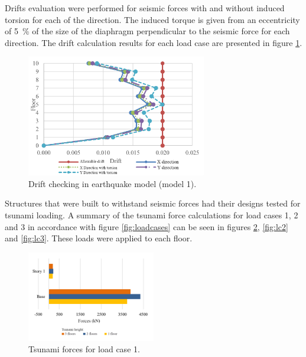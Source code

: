 \documentclass{cup-pan}
\begin{document}
Drifts evaluation were performed for seismic forces with and without induced torsion for each of the direction. The induced torque is given from an eccentricity of \SI{5}{\percent} of the size of the diaphragm perpendicular to the seismic force for each direction. The drift calculation results for each load case are presented in figure \ref{fig:driftchecking}.

\begin{figure}[H]
\centering
\includegraphics[width=0.7\textwidth]{Picture8_engels.png}
\caption{Drift checking in earthquake model (model 1).}
\label{fig:driftchecking}
\end{figure}

Structures that were built to withstand seismic forces had their designs tested for tsunami loading. A summary of the tsunami force calculations for load cases 1, 2 and 3 in accordance with figure \ref{fig:loadcases} can be seen in figures \ref{fig:lc1}, \ref{fig:lc2} and \ref{fig:lc3}. These loads were applied to each floor.

\begin{figure}[H]
\centering
\includegraphics[width=0.5\textwidth]{Picture9_engels.png}
\caption{Tsunami forces for load case 1.}
\label{fig:lc1}
\end{figure}
\end{document}
